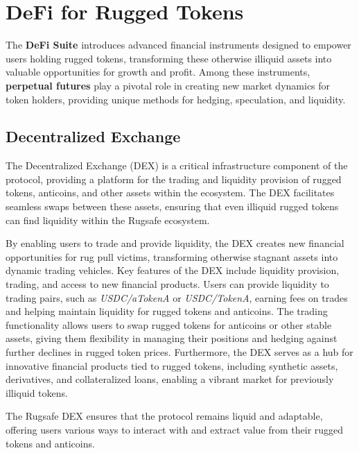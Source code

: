 \documentclass{article}
\begin{document}
\section{DeFi for Rugged Tokens}

The \textbf{DeFi Suite} introduces advanced financial instruments designed to empower users holding rugged tokens, transforming these otherwise illiquid assets into valuable opportunities for growth and profit. Among these instruments, \textbf{perpetual futures} play a pivotal role in creating new market dynamics for token holders, providing unique methods for hedging, speculation, and liquidity.


\subsection{Decentralized Exchange}

The Decentralized Exchange (DEX) is a critical infrastructure component of the protocol, providing a platform for the trading and liquidity provision of rugged tokens, anticoins, and other assets within the ecosystem. The DEX facilitates seamless swaps between these assets, ensuring that even illiquid rugged tokens can find liquidity within the Rugsafe ecosystem.

By enabling users to trade and provide liquidity, the DEX creates new financial opportunities for rug pull victims, transforming otherwise stagnant assets into dynamic trading vehicles. Key features of the DEX include liquidity provision, trading, and access to new financial products. Users can provide liquidity to trading pairs, such as \textit{USDC/aTokenA} or \textit{USDC/TokenA}, earning fees on trades and helping maintain liquidity for rugged tokens and anticoins. The trading functionality allows users to swap rugged tokens for anticoins or other stable assets, giving them flexibility in managing their positions and hedging against further declines in rugged token prices. Furthermore, the DEX serves as a hub for innovative financial products tied to rugged tokens, including synthetic assets, derivatives, and collateralized loans, enabling a vibrant market for previously illiquid tokens.

The Rugsafe DEX ensures that the protocol remains liquid and adaptable, offering users various ways to interact with and extract value from their rugged tokens and anticoins.
\end{document}
